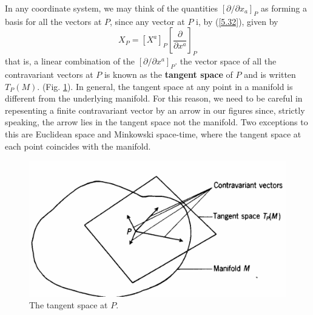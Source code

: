 In any coordinate system, we may think of the quantities $[\partial/\partial x_a]_P$ as forming a basis for all the vectors at $P$, since any vector at $P$ i, by (\ref{5.32}), given by $$X_P=[X^{a}]_P\left[\frac{\partial}{\partial x^{a}}\right]_P$$ that is, a linear combination of the $[\partial/\partial x^{a}]_P$. the vector space of all the contravariant vectors at $P$ is known as the \textbf{tangent space} of $P$ and is written $T_P(M)$. (Fig. \ref{fig:5.6}). In general, the tangent space at any point in a manifold is different from the underlying manifold. For this reason, we need to be careful in repesenting a finite contravariant vector by an arrow in our figures since, strictly speaking, the arrow lies in the tangent space not the manifold. Two exceptions to this are Euclidean space and Minkowski space-time, where the tangent space at each point coincides with the manifold.
\begin{figure}[h!]
	\begin{center}
		\includegraphics[scale=0.4]{fig/fig:5-6.png}
    \caption{The tangent space at $P$.}
    \label{fig:5.6}
	\end{center}	
\end{figure}

